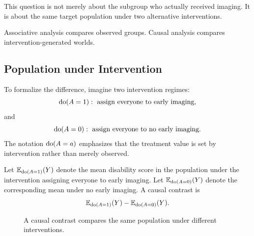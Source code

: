 This question is not merely about the subgroup who actually received imaging. It is about the same target population under two alternative interventions.

\begin{keyidea}
Associative analysis compares observed groups. Causal analysis compares intervention-generated worlds.
\end{keyidea}

\subsection{Population under Intervention}

To formalize the difference, imagine two intervention regimes:
\[
\operatorname{do}(A=1): \text{ assign everyone to early imaging},
\]
and
\[
\operatorname{do}(A=0): \text{ assign everyone to no early imaging}.
\]
The notation $\operatorname{do}(A=a)$ emphasizes that the treatment value is set by intervention rather than merely observed.

Let $\mathbb{E}_{\operatorname{do}(A=1)}(Y)$ denote the mean disability score in the population under the intervention assigning everyone to early imaging. Let $\mathbb{E}_{\operatorname{do}(A=0)}(Y)$ denote the corresponding mean under no early imaging. A causal contrast is
\[
\mathbb{E}_{\operatorname{do}(A=1)}(Y)-\mathbb{E}_{\operatorname{do}(A=0)}(Y).
\]

\begin{figure}[H]
\centering
{}
\caption{A causal contrast compares the same population under different interventions.}
\end{figure}

